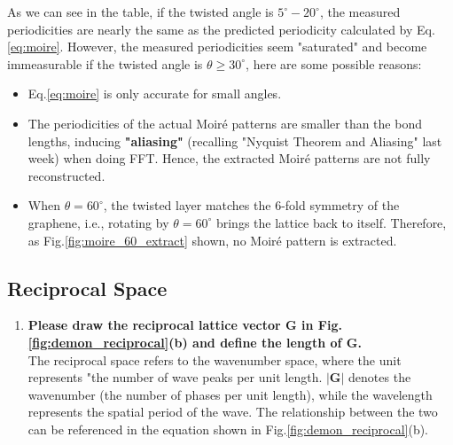 \documentclass[12pt,a4paper]{article}
\begin{document}
\begin{CJK}{UTF8}{bkai}
As we can see in the table,  if the twisted angle is $5^\circ-20^\circ$, the measured periodicities are nearly the same as the predicted periodicity calculated by Eq.\ref{eq:moire}. However, the measured periodicities seem "saturated" and become immeasurable if the twisted angle is $\theta\geq30^\circ$, here are some possible reasons:
\begin{itemize}
    \item Eq.\ref{eq:moire} is only accurate for small angles.
    \item The periodicities of the actual Moiré patterns are smaller than the bond lengths, inducing \textbf{"aliasing"} (recalling "Nyquist Theorem and Aliasing" last week) when doing FFT. Hence, the extracted Moiré patterns are not fully reconstructed.
    \item When $\theta=60^\circ$, the twisted layer matches the 6-fold symmetry of the graphene, i.e., rotating by $\theta=60^\circ$ brings the lattice back to itself. Therefore, as Fig.\ref{fig:moire_60_extract} shown, no Moiré pattern is extracted.
\end{itemize}

\clearpage
\subsection{Reciprocal Space}\label{subsec:discussion_reciprocal}

\begin{enumerate}
    \item \textbf{Please draw the reciprocal lattice vector G in Fig.\ref{fig:demon_reciprocal}(b) and define the length of G.}\\
    The reciprocal space refers to the wavenumber space, where the unit represents "the number of wave peaks per unit length. $|\mathbf{G}|$ denotes the wavenumber (the number of phases per unit length), while the wavelength represents the spatial period of the wave. The relationship between the two can be referenced in the equation shown in Fig.\ref{fig:demon_reciprocal}(b).
    

\end{enumerate}
\end{CJK}
\end{document}
